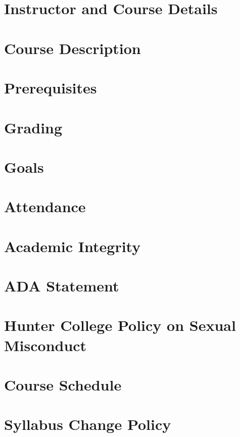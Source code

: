 \documentclass[11pt]{article} %
\title{\coursenumber\\\coursetitle}
\author{}
\date{\semester}
\begin{document}
\pagestyle{fancy} 
\fancyhead{}
\lhead{\coursenumber} %
\rhead{\semester} %

\maketitle

\thispagestyle{fancy}

\section*{Instructor and Course Details}

\section*{Course Description}

\section*{Prerequisites}

\section*{Grading}

\section*{Goals}

\section*{Attendance}

\section*{Academic Integrity}

\section*{ADA Statement}

\section*{Hunter College Policy on Sexual Misconduct}

\section*{Course Schedule}

\section*{Syllabus Change Policy}

\end{document}
